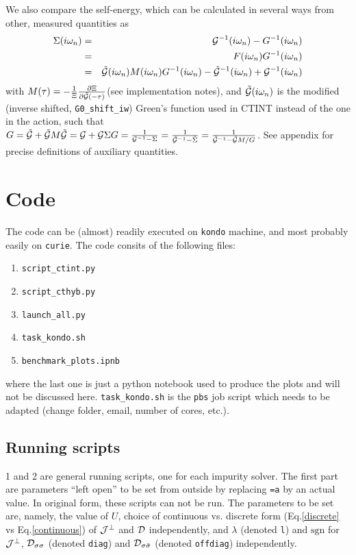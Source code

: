 \documentclass[a4paper,10pt]{article}
\begin{document}
We also compare the self-energy, which can be calculated in several ways from other, measured quantities as
\begin{eqnarray}
 \Sigma(i\omega_n) &=& {\cal G}^{-1}(i\omega_n) - G^{-1}(i\omega_n) \\
                   &=& F(i\omega_n) G^{-1}(i\omega_n) \\
                   &=& \tilde{\cal G}(i\omega_n) M(i\omega_n) G^{-1}(i\omega_n) - \tilde{\cal G}^{-1}(i\omega_n) + {\cal G}^{-1}(i\omega_n)
\end{eqnarray}
with $M(\tau) = -\frac{1}{\Xi}\frac{\partial \Xi}{\partial \tilde{\cal G}(-\tau)}$(see implementation notes), and $\tilde{\cal G}(i\omega_n)$ is the modified (inverse shifted, {\tt G0\_shift\_iw}) Green's function used in CTINT instead of the one in the action, such that $ G = \tilde{\cal G} + \tilde{\cal G} M \tilde{\cal G} = {\cal G} + {\cal G} \Sigma G = \frac{1}{{\cal G}^{-1}-\Sigma} = \frac{1}{\tilde{\cal G}^{-1}-\tilde\Sigma} = \frac{1}{\tilde{\cal G}^{-1}-\tilde{\cal G}M/G}$. See appendix for precise definitions of auxiliary quantities.

\section{Code}

The code can be (almost) readily executed on {\tt kondo} machine, and most probably easily on {\tt curie}.
The code consits of the following files:
\begin{enumerate}
 \item {\tt script\_ctint.py}
 \item {\tt script\_cthyb.py}
 \item {\tt launch\_all.py}
 \item {\tt task\_kondo.sh} 
 \item {\tt benchmark\_plots.ipnb} 
\end{enumerate}
where the last one is just a python notebook used to produce the plots and will not be discussed here. {\tt task\_kondo.sh} is the {\tt pbs} job script which needs to be adapted (change folder, email, number of cores, etc.).

\subsection{Running scripts}
1 and 2 are general running scripts, one for each impurity solver. The first part are parameters ``left open'' to be set from outside by replacing {\tt=a} by an actual value. In original form, these scripts can not be run. The parameters to be set are, namely, the value of $U$, choice of continuous vs. discrete form (Eq.\ref{discrete} vs Eq.\ref{continuous}) of ${\cal J}^\perp$ and ${\cal D}$ independently, and $\lambda$ (denoted {\tt l}) and $\mathrm{sgn}$ for ${\cal J}^\perp$, ${\cal D}_{\sigma\sigma}$ (denoted {\tt diag}) and ${\cal D}_{\sigma\bar\sigma}$ (denoted {\tt offdiag}) independently.
\end{document}
